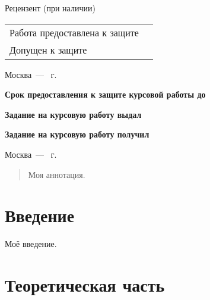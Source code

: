 \documentclass{../mirea-prog-lang}
\begin{document}
\begin{titlepage}
	Рецензент (при наличии)  \hfill{} \bigskip\par
	\begin{tabular}{@{}ll}
		Работа предоставлена к защите & \blankDate{}{} \bigskip\\
		Допущен к защите & \blankDate{}{}
	\end{tabular}
	\begin{center}
		\vfill Москва~--- \the\year{}~г.
	\end{center}
	\newpage
	\textbf{Срок предоставления к защите курсовой работы до} \hfill\blankDate{}{} \par
	\textbf{Задание на курсовую работу выдал}  \hfill{} \par
	\hfill\blankDate{}{} \par
	\textbf{Задание на курсовую работу получил}  \hfill{} \par\bigskip
	\begin{center}
		Москва~--- \the\year{}~г.
	\end{center}
\end{titlepage}
\addtocounter{page}{2}



\begin{abstract}
Моя аннотация.
\end{abstract}



\tableofcontents



\section*{Введение}
{}

Моё введение.



\section{Теоретическая часть}
\end{document}
